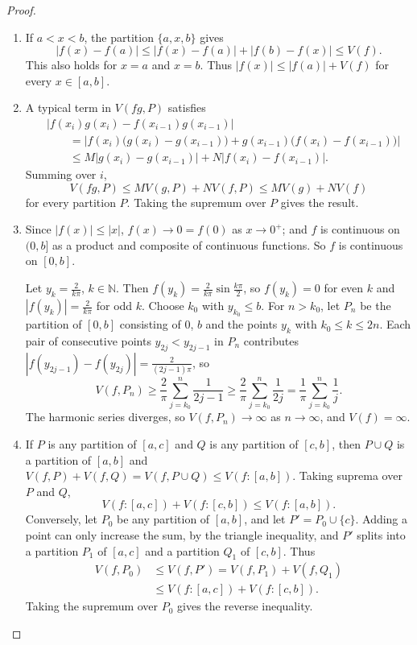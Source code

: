 \documentclass[11pt,a4paper]{article}
\numberwithin{equation}{section}
\theoremstyle{definition}
\begin{document}
\begin{proof}
\begin{enumerate}
\item[(a)] If $a< x < b$, the partition $\{a, x, b\}$ gives
$$|f(x) - f(a)| \leq |f(x) - f(a)| + |f(b) - f(x)| \leq V(f) .$$
This also holds for $x = a$ and $x=b$. Thus $|f(x)| \leq |f(a)| + V(f)$ for every $x\in[a,b]$.

\item[(b)] A typical term in $V(fg, P)$ satisfies
\begin{align*}
&|f(x_i) g(x_i) - f(x_{i - 1}) g(x_{i - 1})| \\
&\qquad= \bigl|f(x_i)\bigl(g(x_i) - g(x_{i-1})\bigr) + g(x_{i-1})\bigl(f(x_i) - f(x_{i - 1})\bigr)\bigr|\\
&\qquad\leq M |g(x_i) - g(x_{i-1})| + N |f(x_i) - f(x_{i - 1})| .
\end{align*}
Summing over $i$,
$$V(fg,P) \leq M V(g,P) + N V(f,P) \leq M V(g) + N V(f)$$
for every partition $P$. Taking the supremum over $P$ gives the result.

\item[(c)] Since $|f(x)|\leq |x|$, $f(x)\longrightarrow 0 = f(0)$ as $x\longrightarrow 0^+$; and $f$ is continuous on $(0,b]$ as a product and composite of continuous functions. So $f$ is continuous on $[0,b]$.

Let $y_k = \frac{2}{k\pi}$, $k\in\mathbb{N}$. Then $f(y_k) = \frac{2}{k\pi}\sin\frac{k\pi}{2}$, so $f(y_k) = 0$ for even $k$ and $|f(y_k)| = \frac{2}{k\pi}$ for odd $k$. Choose $k_0$ with $y_{k_0}\leq b$. For $n > k_0$, let $P_n$ be the partition of $[0,b]$ consisting of $0$, $b$ and the points $y_k$ with $k_0\leq k\leq 2n$. Each pair of consecutive points $y_{2j}<y_{2j-1}$ in $P_n$ contributes $|f(y_{2j-1}) - f(y_{2j})| = \frac{2}{(2j-1)\pi}$, so
$$V(f,P_n) \geq \frac{2}{\pi}\sum_{j=k_0}^{n} \frac{1}{2j-1} \geq \frac{2}{\pi}\sum_{j=k_0}^{n} \frac{1}{2j} = \frac{1}{\pi}\sum_{j=k_0}^{n} \frac{1}{j} .$$
The harmonic series diverges, so $V(f,P_n)\longrightarrow\infty$ as $n\longrightarrow\infty$, and $V(f) = \infty$.

\item[(d)] If $P$ is any partition of $[a,c]$ and $Q$ is any partition of $[c,b]$, then $P\cup Q$ is a partition of $[a,b]$ and $V(f,P) + V(f,Q) = V(f, P\cup Q) \leq V(f: [a,b])$. Taking suprema over $P$ and $Q$,
$$V(f: [a,c]) + V(f: [c,b]) \leq V(f: [a,b]) .$$
Conversely, let $P_0$ be any partition of $[a,b]$, and let $P' = P_0\cup\{c\}$. Adding a point can only increase the sum, by the triangle inequality, and $P'$ splits into a partition $P_1$ of $[a,c]$ and a partition $Q_1$ of $[c,b]$. Thus
\begin{align*}
V(f,P_0) &\leq V(f,P') = V(f,P_1) + V(f, Q_1)\\
&\leq V(f: [a,c]) + V(f: [c,b]) .
\end{align*}
Taking the supremum over $P_0$ gives the reverse inequality.
\end{enumerate}
\end{proof}
\end{document}

